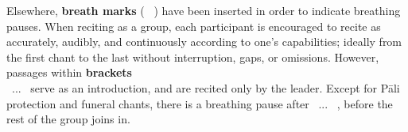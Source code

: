 Elsewhere, \textbf{breath marks} ( \abbrbreathmark\ ) have been inserted in order to indicate breathing pauses. When reciting as a group, each participant is encouraged to recite as accurately, audibly, and continuously according to one's capabilities; ideally from the first chant to the last without interruption, gaps, or omissions. However, passages within \textbf{brackets} \ifninebythirteenversion \\ \fi \anglebracketleft\ \hspace{-0.5mm}... \hspace{-0.8mm}\anglebracketright\ serve as an introduction, and are recited only by the leader. Except for Pāli protection and funeral chants, there is a breathing pause after \anglebracketleft\ \hspace{-0.5mm}... \hspace{-0.8mm}\anglebracketright\ , before the rest of the group joins in.

\clearpage

